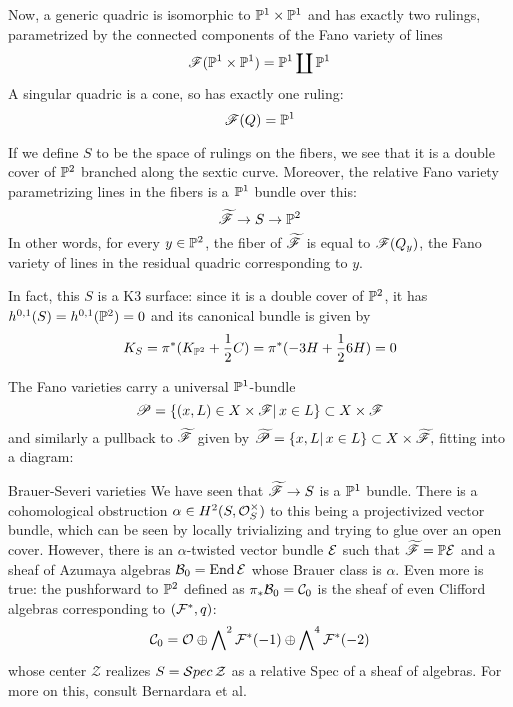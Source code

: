 Now, a generic quadric is isomorphic to $\P^1 \times \P^1$ and has exactly two rulings, parametrized by the connected components of the Fano variety of lines $$\scrF(\P^1 \times \P^1)=\P^1 \coprod \P^1$$
A singular quadric is a cone, so has exactly one ruling: $$\scrF(Q)=\P^1$$

If we define $S$ to be the space of rulings on the fibers, we see that it is a double cover of $\P^2$ branched along the sextic curve. Moreover, the relative Fano variety parametrizing lines in the fibers is a $\P^1$ bundle over this: $$\tscrF \rightarrow S \rightarrow \P^2$$
In other words, for every $y\in \P^2$, the fiber of $\tscrF$ is equal to $\scrF(Q_y)$, the Fano variety of lines in the residual quadric corresponding to $y$.

In fact, this $S$ is a K3 surface: since it is a double cover of $\P^2$, it has $h^{0,1}(S)=h^{0,1}(\P^2)=0$ and its canonical bundle is given by $$K_S = \pi^*(K_{\P^2}+\frac{1}{2}C)=\pi^*(-3H +\frac{1}{2}6H)=0$$

The Fano varieties carry a universal $\P^1$-bundle $$\scrP = \{ (x,L)\in X\times \scrF | \, x\in L\} \subset X \times \scrF$$
and similarly a pullback to $\tscrF$ given by $\tscrP = \{ x,L | \, x\in L\} \subset X \times \tscrF,$
fitting into a diagram: 
\begin{center}
\end{center}

\begin{remark}{Brauer-Severi varieties}{}
    We have seen that $\tscrF\rightarrow S$ is a $\P^1$ bundle. There is a cohomological obstruction $\alpha \in H^2(S, \O_S^\times)$ to this being a projectivized vector bundle, which can be seen by locally trivializing and trying to glue over an open cover. However, there is an $\alpha$-twisted vector bundle $\calE$ such that $\tscrF=\P \calE$ and a sheaf of Azumaya algebras $\calB_0 = \mathrm{End}\,\calE$ whose Brauer class is $\alpha$.  Even more is true: the pushforward to $\P^2$ defined as $\pi_* \calB_0 = \calC_0$ is the sheaf of even Clifford algebras corresponding to $(\calF^*, q)$: $$\calC_0=\O \oplus \bigwedge\nolimits^2 \calF^*(-1)\oplus \bigwedge\nolimits^4\calF^*(-2)$$ whose center $\mathcal{Z}$ realizes $S=\calS pec\, \mathcal{Z}$ as a relative Spec of a sheaf of algebras. For more on this, consult Bernardara et al.
    
\end{remark}

